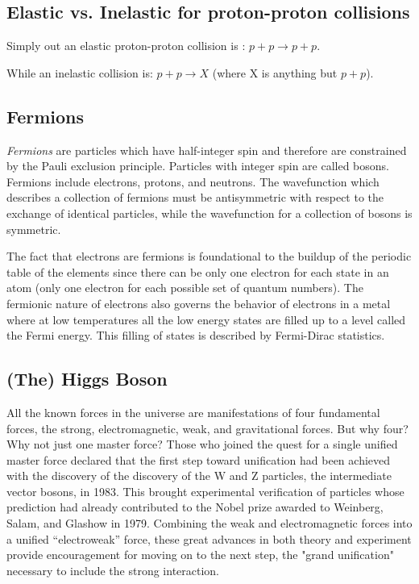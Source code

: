\documentclass{article}
\begin{document}
\subsection{Elastic vs. Inelastic for proton-proton collisions}
Simply out an elastic proton-proton collision is : $p + p \longrightarrow p + p$.

While an inelastic collision is: $p + p \longrightarrow X$ (where X is anything but $p + p$).

\subsection{Fermions}
\emph{Fermions} are particles which have half-integer spin and therefore are constrained by the Pauli exclusion principle. Particles with integer spin are called bosons. Fermions include electrons, protons, and neutrons. The wavefunction which describes a collection of fermions must be antisymmetric with respect to the exchange of identical particles, while the wavefunction for a collection of bosons is symmetric.

The fact that electrons are fermions is foundational to the buildup of the periodic table of the elements since there can be only one electron for each state in an atom (only one electron for each possible set of quantum numbers). The fermionic nature of electrons also governs the behavior of electrons in a metal where at low temperatures all the low energy states are filled up to a level called the Fermi energy. This filling of states is described by Fermi-Dirac statistics.
\subsection{(The) Higgs Boson}
All the known forces in the universe are manifestations of four fundamental forces, the strong, electromagnetic, weak, and gravitational forces. But why four? Why not just one master force? Those who joined the quest for a single unified master force declared that the first step toward unification had been achieved with the discovery of the discovery of the W and Z particles, the intermediate vector bosons, in 1983. This brought experimental verification of particles whose prediction had already contributed to the Nobel prize awarded to Weinberg, Salam, and Glashow in 1979. Combining the weak and electromagnetic forces into a unified ``electroweak'' force, these great advances in both theory and experiment provide encouragement for moving on to the next step, the "grand unification" necessary to include the strong interaction.
\end{document}
